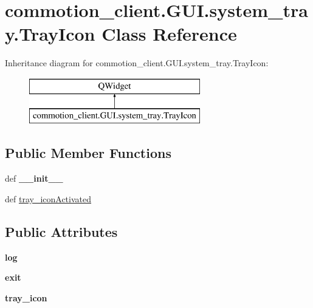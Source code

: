 \hypertarget{classcommotion__client_1_1GUI_1_1system__tray_1_1TrayIcon}{\section{commotion\+\_\+client.\+G\+U\+I.\+system\+\_\+tray.\+Tray\+Icon Class Reference}
\label{classcommotion__client_1_1GUI_1_1system__tray_1_1TrayIcon}
}
Inheritance diagram for commotion\+\_\+client.\+G\+U\+I.\+system\+\_\+tray.\+Tray\+Icon\+:\begin{figure}[H]
\begin{center}
\leavevmode
\includegraphics[height=2.000000cm]{classcommotion__client_1_1GUI_1_1system__tray_1_1TrayIcon}
\end{center}
\end{figure}
\subsection*{Public Member Functions}
\begin{DoxyCompactItemize}
\item 
\hypertarget{classcommotion__client_1_1GUI_1_1system__tray_1_1TrayIcon_aca280c4231a261edb8caacd712931840}{def {\bfseries \+\_\+\+\_\+init\+\_\+\+\_\+}}\label{classcommotion__client_1_1GUI_1_1system__tray_1_1TrayIcon_aca280c4231a261edb8caacd712931840}

\item 
def \hyperlink{classcommotion__client_1_1GUI_1_1system__tray_1_1TrayIcon_a31999bfda4008b7395def282e37b4d5c}{tray\+\_\+icon\+Activated}
\end{DoxyCompactItemize}
\subsection*{Public Attributes}
\begin{DoxyCompactItemize}
\item 
\hypertarget{classcommotion__client_1_1GUI_1_1system__tray_1_1TrayIcon_acf0eb7b591dfcf509b0d5eb0d57247dc}{{\bfseries log}}\label{classcommotion__client_1_1GUI_1_1system__tray_1_1TrayIcon_acf0eb7b591dfcf509b0d5eb0d57247dc}

\item 
\hypertarget{classcommotion__client_1_1GUI_1_1system__tray_1_1TrayIcon_a3a048d00c09481b8655b1b6ea357b4e0}{{\bfseries exit}}\label{classcommotion__client_1_1GUI_1_1system__tray_1_1TrayIcon_a3a048d00c09481b8655b1b6ea357b4e0}

\item 
\hypertarget{classcommotion__client_1_1GUI_1_1system__tray_1_1TrayIcon_a1d5c21e34150d0320feeaecce88e42d9}{{\bfseries tray\+\_\+icon}}\label{classcommotion__client_1_1GUI_1_1system__tray_1_1TrayIcon_a1d5c21e34150d0320feeaecce88e42d9}

\end{DoxyCompactItemize}
